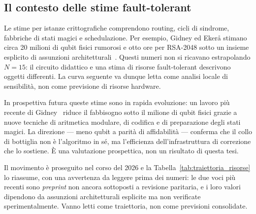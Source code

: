 \begin{onehalfspace}
\section{Il contesto delle stime fault-tolerant}
\label{sec:resource_estimates}

Le stime per istanze crittografiche comprendono routing, cicli di sindrome, fabbriche di stati magici e schedulazione. Per esempio, Gidney ed Eker\aa{} stimano circa 20 milioni di qubit fisici rumorosi e otto ore per RSA-2048 sotto un insieme esplicito di assunzioni architetturali~\cite{gidney2021}. Questi numeri non si ricavano estrapolando $N=15$: il circuito didattico e una stima di risorse fault-tolerant descrivono oggetti differenti. La curva seguente va dunque letta come analisi locale di sensibilit\`a, non come previsione di risorse hardware.

In prospettiva futura queste stime sono in rapida evoluzione: un lavoro pi\`u{} recente di
Gidney~\cite{gidney2025} riduce il fabbisogno sotto il milione di qubit fisici grazie a
nuove tecniche di aritmetica modulare, di codifica e di preparazione degli stati magici.
La direzione --- meno qubit a parit\`a{} di affidabilit\`a{} --- conferma che il
collo di bottiglia non \`e{} l'algoritmo in s\'e{}, ma l'efficienza dell'infrastruttura
di correzione che lo sostiene. \`E{} una valutazione prospettica, non un risultato di questa tesi.

Il movimento \`e proseguito nel corso del 2026 e la Tabella~\ref{tab:traiettoria_risorse} lo riassume, con una avvertenza da leggere prima dei numeri: le due voci pi\`u{} recenti sono \emph{preprint} non ancora sottoposti a revisione paritaria, e i loro valori dipendono da assunzioni architetturali esplicite ma non verificate sperimentalmente. Vanno letti come traiettoria, non come previsioni consolidate.


\end{onehalfspace}
